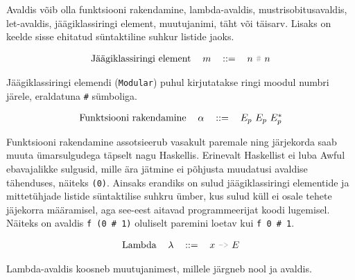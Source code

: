 \documentclass[12pt]{article}
\begin{document}
      Avaldis võib olla funktsiooni rakendamine, lambda-avaldis, mustrisobitusavaldis, let-avaldis, jäägiklassiringi element, muutujanimi, täht või täisarv. Lisaks on keelde sisse ehitatud süntaktiline suhkur listide jaoks.

      \begin{equation*}
        \begin{tabular}{llll}
          Jäägiklassiringi element & $m$ & $::=$ & $n$ {\color{helehall}\verb!#!} $n$
        \end{tabular}
      \end{equation*}

      Jäägiklassiringi elemendi (\verb!Modular!) puhul kirjutatakse ringi moodul numbri järele, eraldatuna \verb!#! sümboliga.

      \begin{equation*}
        \begin{tabular}{llll}
          Funktsiooni rakendamine & $\alpha$ & $::=$ & $E_p$ $E_p$ $E_p^*$
        \end{tabular}
      \end{equation*}

      Funktsiooni rakendamine assotsieerub vasakult paremale ning järjekorda saab muuta ümarsulgudega täpselt nagu Haskellis. Erinevalt Haskellist ei luba Awful ebavajalikke sulgusid, mille ära jätmine ei põhjusta muudatusi avaldise tähenduses, näiteks \verb!(0)!. Ainsaks erandiks on sulud jäägiklassiringi elementide ja mittetühjade listide süntaktilise suhkru ümber, kus sulud küll ei osale tehete jäjekorra määramisel, aga see-eest aitavad programmeerijat koodi lugemisel. Näiteks on avaldis \verb!f (0 # 1)! oluliselt paremini loetav kui \verb!f 0 # 1!.

      \begin{equation*}
        \begin{tabular}{llll}
          Lambda & $\lambda$ & $::=$ & $x$ {\color{helehall}\verb!->!} $E$
        \end{tabular}
      \end{equation*}

      Lambda-avaldis koosneb muutujanimest, millele järgneb nool ja avaldis.
\end{document}
